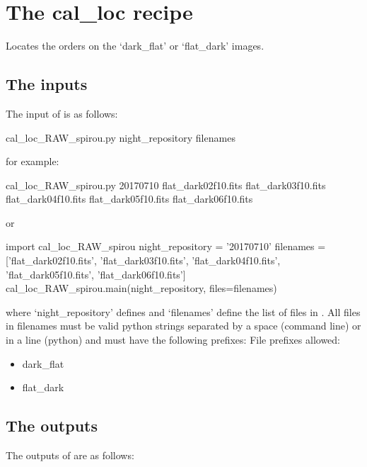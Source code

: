 \clearpage
\newpage
\section{The cal\_loc recipe}
\label{ch:the_recipes:cal_loc_RAW_spirou}

Locates the orders on the `dark\_flat' or `flat\_dark' images.\\

\subsection{The inputs}
The input of \callocRAW is as follows:
\begin{cmdbox}
cal_loc_RAW_spirou.py night_repository filenames
\end{cmdbox}
\noindent for example:
\begin{cmdbox}[title={example}]
cal_loc_RAW_spirou.py 20170710 flat_dark02f10.fits flat_dark03f10.fits flat_dark04f10.fits flat_dark05f10.fits flat_dark06f10.fits
\end{cmdbox}
\noindent or
\begin{pythonbox}
import cal_loc_RAW_spirou
night_repository = '20170710'
filenames = ['flat_dark02f10.fits', 'flat_dark03f10.fits', 'flat_dark04f10.fits',
             'flat_dark05f10.fits', 'flat_dark06f10.fits']
cal_loc_RAW_spirou.main(night_repository, files=filenames)
\end{pythonbox}

\noindent where `night\_repository' defines \argnightname and `filenames' define the list of files in \argfilenames. All files in filenames must be valid python strings separated by a space (command line) or in a line (python) and must have the following prefixes:
\noindent File prefixes allowed:
\begin{itemize}
	\item dark\_flat
	\item flat\_dark
\end{itemize}

\subsection{The outputs}
The outputs of \callocRAW are as follows:


